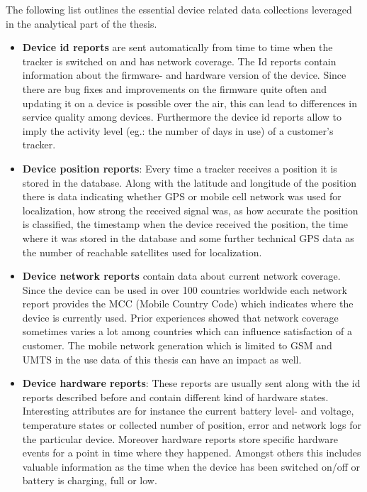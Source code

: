 The following list outlines the essential device related data collections leveraged in the analytical part of the thesis. 

\begin{itemize}
	\item \textbf{Device id reports} are sent automatically from time to time when the tracker is switched on and has network coverage. The Id reports contain information about the firmware- and hardware version of the device. Since there are bug fixes and improvements on the firmware quite often and updating it on a device is possible over the air, this can lead to differences in service quality among devices. Furthermore the device id reports allow to imply the activity level (eg.: the number of days in use) of a customer's tracker.
	\item \textbf{Device position reports}: Every time a tracker receives a position it is stored in the database. Along with the latitude and longitude of the position there is data indicating whether GPS or mobile cell network was used for localization, how strong the received signal was, as how accurate the position is classified, the timestamp when the device received the position, the time where it was stored in the database and some further technical GPS data as the number of reachable satellites used for localization. 
	\item \textbf{Device network reports} contain data about current network coverage. Since the device can be used in over 100 countries worldwide each network report provides the MCC (Mobile Country Code) which indicates where the device is currently used. Prior experiences showed that network coverage sometimes varies a lot among countries which can influence satisfaction of a customer. The mobile network generation which is limited to GSM and UMTS in the use data of this thesis can have an impact as well.
	\item \textbf{Device hardware reports}: These reports are usually sent along with the id reports described before and contain different kind of hardware states. Interesting attributes are for instance the current battery level- and voltage, temperature states or collected number of position, error and network logs for the particular device. Moreover hardware reports store specific hardware events for a point in time where they happened. Amongst others this includes valuable information as the time when the device has been switched on/off or battery is charging, full or low. 

\end{itemize}
